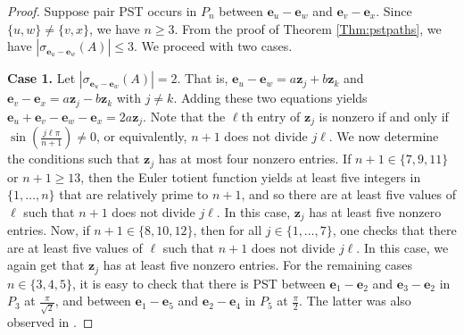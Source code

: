 \documentclass[11pt]{article}
\newcommand{\be}{\mathbf e}
\newcommand{\bz}{\mathbf z}
\begin{document}
\begin{proof}
Suppose pair PST occurs in $P_n$ between $\be_u-\be_w$ and $\be_v-\be_x$. Since $\{u,w\}\neq \{v,x\}$, we have $n\geq 3$. From the proof of Theorem \ref{Thm:pstpaths}, we have $|\sigma_{\be_u-\be_w}(A)|\leq 3$. We proceed with two cases.

\noindent \textbf{Case 1.} Let $|\sigma_{\be_u-\be_w}(A)|=2$. That is, $\be_u-\be_w=a\bz_j+b\bz_k$ and $\be_v-\be_x=a\bz_j-b\bz_k$ with $j\neq k$. Adding these two equations yields $\be_u+\be_v-\be_w-\be_x=2a\bz_j$. Note that the $\ell$th entry of $\bz_j$ is nonzero if and only if $\sin\left(\frac{j\ell\pi}{n+1}\right)\neq 0$, or equivalently, $n+1$ does not divide $j\ell$. We now determine the conditions such that $\bz_j$ has at most four nonzero entries. If $n+1\in\{7,9,11\}$ or $n+1\geq 13$, then the Euler totient function yields at least five integers in $\{1,\ldots,n\}$ that are relatively prime to $n+1$, and so there are at least five values of $\ell$ such that $n+1$ does not divide $j\ell$. In this case, $\bz_j$ has at least five nonzero entries. Now, if $n+1\in\{8,10,12\}$, then for all $j\in\{1,\ldots,7\}$, one checks that there are at least five values of $\ell$ such that $n+1$ does not divide $j\ell$. In this case, we again get that $\bz_j$ has at least five nonzero entries. For the remaining cases $n\in\{3,4,5\}$, it is easy to check that there is PST between $\be_1-\be_2$ and $\be_3-\be_{2}$ in $P_3$ at $\frac{\pi}{\sqrt{2}}$, and between $\be_1-\be_5$ and $\be_2-\be_{4}$ in $P_5$ at $\frac{\pi}{2}$. The latter was also observed in \cite{pal2024quantum}.


\end{proof}
\end{document}
